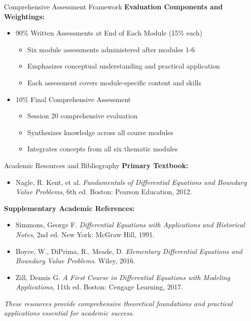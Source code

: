 \documentclass[10pt,aspectratio=169]{beamer}
\newcommand{\concept}[1]{\textbf{#1}}
\newcommand{\emphasis}[1]{\textit{#1}}
\begin{document}
\begin{frame}{Comprehensive Assessment Framework}
    \concept{Evaluation Components and Weightings:}
    
    
    \begin{itemize}
        \item 90\% Written Assessments at End of Each Module (15\% each)
        \begin{itemize}
            \item[\textbullet] Six module assessments administered after modules 1-6
            \item[\textbullet] Emphasizes conceptual understanding and practical application
            \item[\textbullet] Each assessment covers module-specific content and skills
        \end{itemize}
        
        \item 10\% Final Comprehensive Assessment
        \begin{itemize}
            \item[\textbullet] Session 20 comprehensive evaluation
            \item[\textbullet] Synthesizes knowledge across all course modules
            \item[\textbullet] Integrates concepts from all six thematic modules
        \end{itemize}
    \end{itemize}
\end{frame}

\begin{frame}{Academic Resources and Bibliography}
    \concept{Primary Textbook:}
    \begin{itemize}
        \item Nagle, R. Kent, et al. \textit{Fundamentals of Differential Equations and Boundary Value Problems}, 6th ed. Boston: Pearson Education, 2012.
    \end{itemize}
    
    
    \concept{Supplementary Academic References:}
    \begin{itemize}
        \item Simmons, George F. \textit{Differential Equations with Applications and Historical Notes}, 2nd ed. New York: McGraw Hill, 1991.
        \item Boyce, W., DiPrima, R., Meade, D. \textit{Elementary Differential Equations and Boundary Value Problems}. Wiley, 2016.
        \item Zill, Dennis G. \textit{A First Course in Differential Equations with Modeling Applications}, 11th ed. Boston: Cengage Learning, 2017.
    \end{itemize}
    
    
    \emphasis{These resources provide comprehensive theoretical foundations and practical applications essential for academic success.}
\end{frame}
\end{document}
